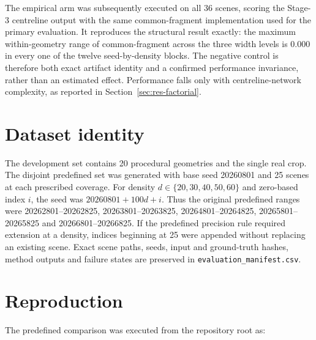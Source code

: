 The empirical arm was subsequently executed on all 36 scenes, scoring the
Stage-3 centreline output with the same common-fragment implementation used for
the primary evaluation. It reproduces the structural result exactly: the
maximum within-geometry range of common-fragment \Fone{} across the three width
levels is $0.000$ in every one of the twelve seed-by-density blocks. The
negative control is therefore both exact artifact identity and a confirmed
performance invariance, rather than an estimated effect. Performance falls only
with centreline-network complexity, as reported in
Section~\ref{sec:res-factorial}.

\section{Dataset identity}
\label{app:data}

The development set contains 20 procedural geometries and the single real crop.
The disjoint predefined set was generated with base seed 20260801 and 25 scenes at
each prescribed coverage. For density $d\in\{20,30,40,50,60\}$ and zero-based
index $i$, the seed was $20260801+100d+i$. Thus the original predefined ranges were
20262801--20262825, 20263801--20263825, 20264801--20264825,
20265801--20265825 and 20266801--20266825. If the predefined precision rule
required extension at a density, indices beginning at 25 were appended without
replacing an existing scene. Exact scene paths, seeds, input and ground-truth
hashes, method outputs and failure states are preserved in
\texttt{evaluation\_manifest.csv}.

\section{Reproduction}
\label{app:repro}

The predefined comparison was executed from the repository root as:

